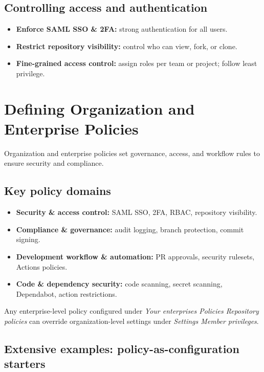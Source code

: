 \documentclass[11pt]{article}
\begin{document}
\subsection{Controlling access and authentication}
\begin{itemize}[leftmargin=*,itemsep=2pt]
  \item \textbf{Enforce SAML SSO \& 2FA:} strong authentication for all users.
  \item \textbf{Restrict repository visibility:} control who can view, fork, or clone.
  \item \textbf{Fine-grained access control:} assign roles per team or project; follow least privilege.
\end{itemize}

\section{Defining Organization and Enterprise Policies}

Organization and enterprise policies set governance, access, and workflow rules to ensure security and compliance.

\subsection{Key policy domains}
\begin{itemize}[leftmargin=*,itemsep=2pt]
  \item \textbf{Security \& access control:} SAML SSO, 2FA, RBAC, repository visibility.
  \item \textbf{Compliance \& governance:} audit logging, branch protection, commit signing.
  \item \textbf{Development workflow \& automation:} PR approvals, security rulesets, Actions policies.
  \item \textbf{Code \& dependency security:} code scanning, secret scanning, Dependabot, action restrictions.
\end{itemize}

\begin{warningbox}
Any enterprise-level policy configured under \textit{Your enterprises \textrightarrow Policies \textrightarrow Repository policies} can override organization-level settings under \textit{Settings \textrightarrow Member privileges}.
\end{warningbox}

\subsection{Extensive examples: policy-as-configuration starters}
\end{document}
